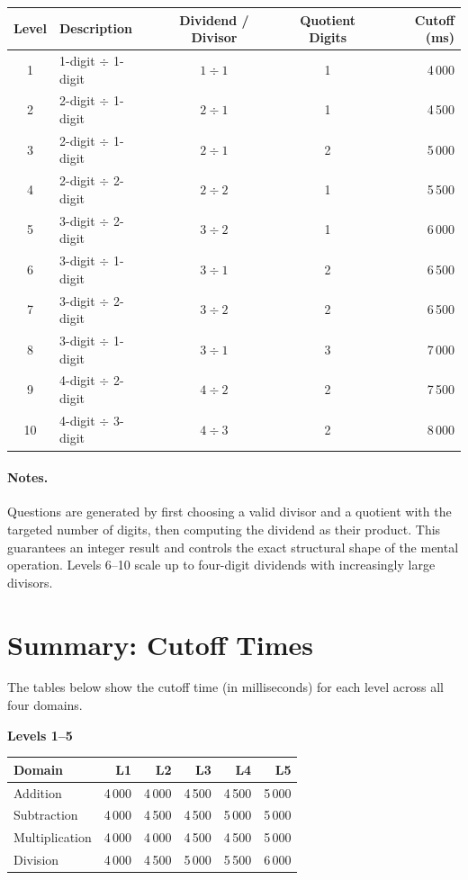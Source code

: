 \documentclass[11pt]{article}
\begin{document}
\begin{longtable}{@{}clccr@{}}
\toprule
\textbf{Level} & \textbf{Description} & \textbf{Dividend / Divisor} & \textbf{Quotient Digits} & \textbf{Cutoff (ms)} \\
\midrule
\endhead
1  & 1-digit $\div$ 1-digit & $1 \div 1$ & 1 & 4\,000 \\
2  & 2-digit $\div$ 1-digit & $2 \div 1$ & 1 & 4\,500 \\
3  & 2-digit $\div$ 1-digit & $2 \div 1$ & 2 & 5\,000 \\
4  & 2-digit $\div$ 2-digit & $2 \div 2$ & 1 & 5\,500 \\
5  & 3-digit $\div$ 2-digit & $3 \div 2$ & 1 & 6\,000 \\
6  & 3-digit $\div$ 1-digit & $3 \div 1$ & 2 & 6\,500 \\
7  & 3-digit $\div$ 2-digit & $3 \div 2$ & 2 & 6\,500 \\
8  & 3-digit $\div$ 1-digit & $3 \div 1$ & 3 & 7\,000 \\
9  & 4-digit $\div$ 2-digit & $4 \div 2$ & 2 & 7\,500 \\
10 & 4-digit $\div$ 3-digit & $4 \div 3$ & 2 & 8\,000 \\
\bottomrule
\end{longtable}

\paragraph{Notes.}
Questions are generated by first choosing a valid divisor and a quotient with the targeted number of digits, then computing the dividend
as their product.  This guarantees an integer result and controls the exact structural shape of the mental operation.  Levels 6–10 scale up to four-digit dividends
with increasingly large divisors.

\section{Summary: Cutoff Times}

The tables below show the cutoff time (in milliseconds) for each level across all four domains.

\noindent\textbf{Levels 1--5}
\begin{center}
\begin{tabular}{@{}lrrrrr@{}}
\toprule
\textbf{Domain} & \textbf{L1} & \textbf{L2} & \textbf{L3} & \textbf{L4} & \textbf{L5} \\
\midrule
Addition        & 4\,000 & 4\,000 & 4\,500 & 4\,500 & 5\,000 \\
Subtraction     & 4\,000 & 4\,500 & 4\,500 & 5\,000 & 5\,000 \\
Multiplication  & 4\,000 & 4\,000 & 4\,500 & 4\,500 & 5\,000 \\
Division        & 4\,000 & 4\,500 & 5\,000 & 5\,500 & 6\,000 \\
\bottomrule
\end{tabular}
\end{center}
\end{document}
